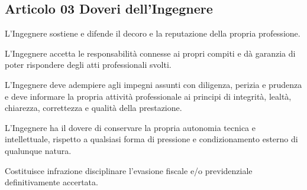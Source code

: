 \documentclass[letterpaper,10pt,italian]{sphinxmanual}
\begin{document}
\subsection{Articolo 03 \sphinxhyphen{} Doveri dell’Ingegnere}
\label{\detokenize{capitoli/codice/codice_deontologico:articolo-03-doveri-dellingegnere}}\begin{description}
\sphinxAtStartPar
L’Ingegnere sostiene e difende il decoro e la reputazione della propria professione.

\sphinxAtStartPar
L’Ingegnere accetta le responsabilità connesse ai propri compiti e dà garanzia di poter rispondere degli atti professionali svolti.

\sphinxAtStartPar
L’Ingegnere deve adempiere agli impegni assunti con diligenza, perizia e prudenza e deve informare la propria attività professionale ai principi di integrità, lealtà, chiarezza, correttezza e qualità della prestazione.

\sphinxAtStartPar
L’Ingegnere ha il dovere di conservare la propria autonomia tecnica e intellettuale, rispetto a qualsiasi forma di pressione e condizionamento esterno di qualunque natura.

\sphinxAtStartPar
Costituisce infrazione disciplinare l’evasione fiscale e/o previdenziale definitivamente accertata.

\end{description}
\end{document}
